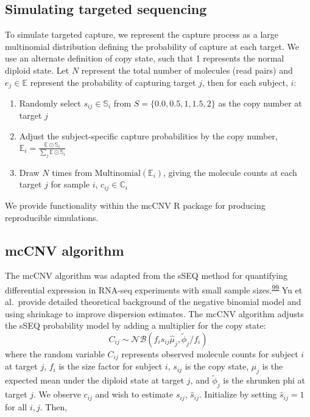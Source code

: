 \documentclass[11pt,letterpaper]{book}
\begin{document}
\hypertarget{simulating-targeted-sequencing}{%
\subsection{Simulating targeted sequencing}\label{simulating-targeted-sequencing}}

To simulate targeted capture, we represent the capture process as a large multinomial distribution defining the probability of capture at each target.
We use an alternate definition of copy state, such that 1 represents the normal diploid state.
Let \(N\) represent the total number of molecules (read pairs) and \(e_j \in \mathbb{E}\) represent the probability of capturing target \(j\), then for each subject, \(i\):

\begin{enumerate}
\def\labelenumi{\arabic{enumi}.}
\item
  Randomly select \(s_{ij} \in \mathbb{S}_i\) from \(S = \{0.0, 0.5, 1, 1.5, 2\}\) as the copy number at target \(j\)
\item
  Adjust the subject-specific capture probabilities by the copy number, \(\mathbb{E}_i = \frac{\mathbb{E} \odot \mathbb{S}_{i}}{\sum_j \mathbb{E} \odot \mathbb{S}_{i}}\)
\item
  Draw \(N\) times from \(\text{Multinomial}(\mathbb{E}_i)\), giving the molecule counts at each target \(j\) for sample \(i\), \(c_{ij} \in \mathbb{C}_i\)
\end{enumerate}

We provide functionality within the mcCNV R package for producing reproducible simulations.

\hypertarget{mccnv-algorithm}{%
\subsection{mcCNV algorithm}\label{mccnv-algorithm}}

The mcCNV algorithm was adapted from the sSEQ method for quantifying differential expression in RNA-seq experiments with small sample sizes.\textsuperscript{\protect\hyperlink{ref-yu:2013aa}{99}}
Yu et al.~provide detailed theoretical background of the negative binomial model and using shrinkage to improve dispersion estimates.
The mcCNV algorithm adjusts the sSEQ probability model by adding a multiplier for the copy state:
\[
  C_{ij} \sim \mathcal{NB}(f_is_{ij}\hat\mu_j, \tilde\phi_j/f_i)
\]
where the random variable \(C_{ij}\) represents observed molecule counts for subject \(i\) at target \(j\), \(f_i\) is the size factor for subject \(i\), \(s_{ij}\) is the copy state, \(\mu_j\) is the expected mean under the diploid state at target \(j\), and \(\tilde\phi_j\) is the shrunken phi at target \(j\).
We observe \(c_{ij}\) and wish to estimate \(s_{ij}\), \(\hat{s}_{ij}\).
Initialize by setting \(\hat{s}_{ij} = 1\) for all \(i,j\). Then,
\end{document}

